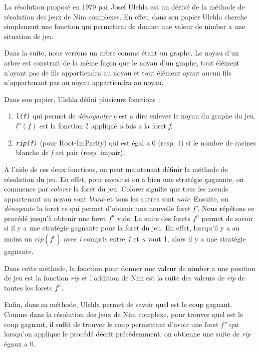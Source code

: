   La résolution proposé en 1979 par Josef Ulehla est un dérivé de la méthode de résolution des jeux de Nim complexes. En effet, dans son papier \cite{UleHack} Ulehla cherche simplement une fonction qui permettrai de donner une valeur de nimber a une situation de jeu.

  Dans la suite, nous verrons un arbre comme étant un graphe. Le noyau d'un arbre est construit de la même façon que le noyau d'un graphe, tout élément n'ayant pas de fils appartiendra au noyau et tout élément ayant aucun fils n'appartenant pas au noyau appartiendra au noyau.

  Dans son papier, Ulehla défini plusieurs fonctions :
  \begin{enumerate}
    \item \textit{\texttt{l(f)}} qui permet de \textit{dénoyauter} c'est a dire enlever le noyau du graphe du jeu. $l^n(f)$ est la fonction \textit{\texttt{l}} appliqué \textit{n} fois a la foret \textit{f}.
    \item\textit{\texttt{rip(f)}} (pour Root-ImParity) qui est égal a 0 (resp. 1) si le nombre de racines blanche de \textit{f} est pair (resp. impair).
  \end{enumerate}

  A l'aide de ces deux fonctions, on peut maintenant définir la méthode de résolution du jeu. En effet, pour savoir si on a bien une stratégie gagnante, on commence par \textit{colorer} la foret du jeu. Colorer signifie que tous les nœuds appartenant au noyau sont \textit{blanc} et tous les autres sont \textit{noir}. Ensuite, on \textit{dénoyaute} la foret ce qui permet d'obtenir une nouvelle foret \textit{f'}. Nous répétons ce procédé jusqu’à obtenir une foret $f^n$ vide. La suite des forets $f^n$ permet de savoir si il y a une stratégie gagnante pour la foret du jeu. En effet, lorsqu'il y a au moins un $rip(f^i)$ avec \textit{i} compris entre \textit{1} et \textit{n} vaut 1, alors il y a une stratégie gagnante.

  Dans cette méthode, la fonction pour donner une valeur de nimber a une position de jeu est la fonction \textit{rip} et l'addition de Nim est la suite des valeurs de \textit{rip} de toutes les forets $f^n$.

  Enfin, dans sa méthode, Ulehla permet de savoir quel est le coup gagnant. Comme dans la résolution des jeux de Nim complexe, pour trouver quel est le coup gagnant, il suffit de trouver le coup permettant d'avoir une foret \textit{f''} qui lorsqu'on applique le procédé décrit précédemment, on obtienne une suite de \textit{rip} égaux a 0.

